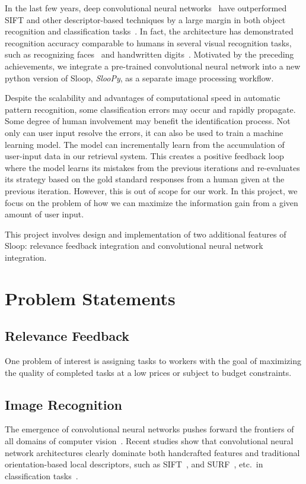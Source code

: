 In the last few years, deep convolutional neural networks~\cite{lecun95, kriz12}
have outperformed SIFT and other descriptor-based techniques by a large margin
in both object recognition and classification tasks~\cite{kriz12, fisher14,
ILSVRC15}. In fact, the architecture has demonstrated recognition accuracy
comparable to humans in several visual recognition tasks, such as recognizing
faces~\cite{deepface14} and handwritten digits~\cite{mnist13}. Motivated by the
preceding achievements, we integrate a pre-trained convolutional neural network
into a new python version of Sloop, \emph{SlooPy}, as a separate image
processing workflow.

Despite the scalability and advantages of computational speed in automatic
pattern recognition, some classification errors may occur and rapidly
propagate. Some degree of human involvement may benefit the identification
process. Not only can user input resolve the errors, it can also be used to
train a machine learning model. The model can incrementally learn from the
accumulation of user-input data in our retrieval system. This creates a
positive feedback loop where the model learns its mistakes from the previous
iterations and re-evaluates its strategy based on the gold standard responses
from a human given at the previous iteration. However, this is out of scope
for our work. In this project, we focus on the problem of how we can maximize
the information gain from a given amount of user input.

This project involves design and implementation of two additional features of
Sloop: relevance feedback integration and convolutional neural network
integration.

\section{Problem Statements}

\subsection{Relevance Feedback} %
\label{sub:relevance_feedback}
One problem of interest is assigning tasks to workers with the goal of maximizing
the quality of completed tasks at a low prices or subject to budget
constraints.

\subsection{Image Recognition} %
\label{sub:image_recognition}
The emergence of convolutional neural networks pushes forward the frontiers of all
domains of computer vision~\cite{lecun95}. Recent studies show that
convolutional neural network architectures clearly dominate both handcrafted
features and traditional orientation-based local descriptors, such as
SIFT~\cite{lowe04}, and SURF~\cite{surf08}, etc.\ in classification
tasks~\cite{fisher14,kriz12,prelu15,ILSVRC15}.

